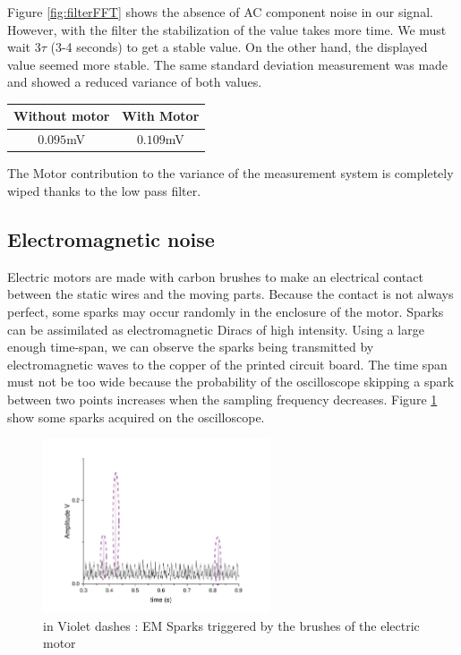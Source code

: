 \documentclass{article}[12pt]
\begin{document}
Figure \ref{fig:filterFFT} shows the absence of AC component noise in our signal. However, with the filter the stabilization of the value takes more time. We must wait $3\tau$ (3-4 seconds) to get a stable value. On the other hand, the displayed value seemed more stable. The same standard deviation measurement was made and showed a reduced variance of both values.
\begin{center}
\begin{tabular}{|c|c|}
    \hline
    Without motor & With Motor \\
    \hline
     $0.095$mV & $0.109$mV \\
    \hline
\end{tabular}
\end{center}
The Motor contribution to the variance of the measurement system is completely wiped thanks to the low pass filter.
\subsection{Electromagnetic noise}
Electric motors are made with carbon brushes to make an electrical contact between the static wires and the moving parts. Because the contact is not always perfect, some sparks may occur randomly in the enclosure of the motor. Sparks can be assimilated as electromagnetic Diracs of high intensity. Using a large enough time-span, we can observe the sparks being transmitted by electromagnetic waves to the copper of the printed circuit board. The time span must not be too wide because the probability of the oscilloscope skipping a spark between two points increases when the sampling frequency decreases. Figure \ref{fig:sparks} show some sparks acquired on the oscilloscope.
\begin{figure}[H]
    \centering
    \includegraphics[width=0.6\textwidth]{figures/sparks.pdf}
    \caption{in Violet dashes : EM Sparks triggered by the brushes of the electric motor}
    \label{fig:sparks}
\end{figure}
\end{document}
